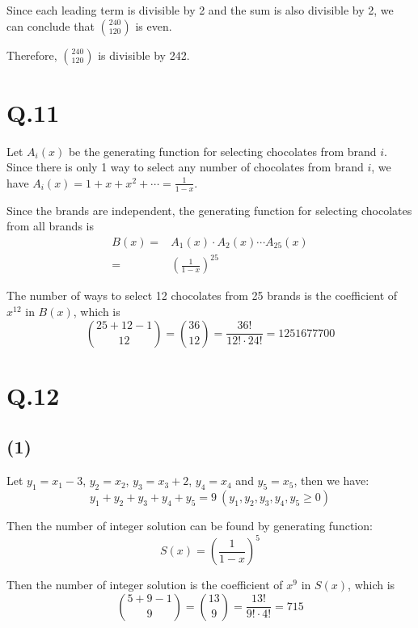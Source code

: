 \documentclass[a4paper,12pt]{article}
\begin{document}
Since each leading term is divisible by 2 and the sum is also divisible by 2, we can conclude that $\binom{240}{120}$ is even.

Therefore, $\binom{240}{120}$ is divisible by 242.

\section*{Q.11}

Let $A_i(x)$ be the generating function for selecting chocolates from brand $i$.
Since there is only 1 way to select any number of chocolates from brand $i$, we have $A_i(x) = 1 + x + x^2 + \cdots = \frac{1}{1 - x}$.

Since the brands are independent, the generating function for selecting chocolates from all brands is
\begin{align*}
	B(x) =& A_1(x) \cdot A_2(x) \cdots A_{25}(x) \\
	=& \left(\frac{1}{1 - x}\right)^{25}
\end{align*}

The number of ways to select 12 chocolates from 25 brands is the coefficient of $x^{12}$ in $B(x)$, which is
\begin{equation*}
	\binom{25 + 12 - 1}{12} = \binom{36}{12} = \frac{36!}{12! \cdot 24!} = 1251677700
\end{equation*}

\section*{Q.12}

\subsection*{(1)}

Let $y_1 = x_1 - 3$, $y_2 = x_2$, $y_3 = x_3 + 2$, $y_4 = x_4$ and $y_5 = x_5$, then we have:
\begin{equation*}
	y_1 + y_2 + y_3 + y_4 + y_5 = 9\ (y_1, y_2, y_3, y_4, y_5 \geq 0)
\end{equation*} 

Then the number of integer solution can be found by generating function:
\begin{equation*}
	S(x) = \left(\frac{1}{1-x}\right)^5 
\end{equation*}

Then the number of integer solution is the coefficient of $x^9$ in $S(x)$, which is
\begin{equation*}
	\binom{5 + 9 - 1}{9} = \binom{13}{9} = \frac{13!}{9! \cdot 4!} = 715
\end{equation*}
\end{document}
